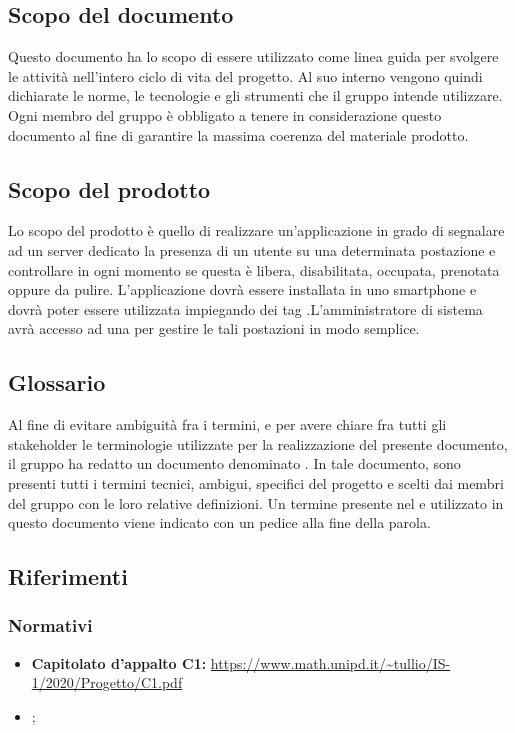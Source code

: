 \subsection{Scopo del documento}
Questo documento ha lo scopo di essere utilizzato come linea guida per svolgere le attività nell'intero ciclo di vita del progetto.
Al suo interno vengono quindi dichiarate le norme, le tecnologie e gli strumenti che il gruppo \Gruppo{} intende utilizzare.
Ogni membro del gruppo è obbligato a tenere in considerazione questo documento al fine di garantire la massima coerenza del materiale prodotto.
	
\subsection{Scopo del prodotto}
Lo scopo del prodotto è quello di realizzare un’applicazione in grado di segnalare ad un server
dedicato la presenza di un utente su una determinata postazione e controllare in ogni momento
se questa è libera, disabilitata, occupata, prenotata oppure da pulire. L’applicazione dovrà essere
installata in uno smartphone  e dovrà poter essere utilizzata impiegando
dei tag .L'amministratore di sistema avrà accesso ad una  per gestire le tali postazioni in modo semplice.

\subsection{Glossario}
Al fine di evitare ambiguità fra i termini, e per avere chiare fra tutti gli stakeholder le terminologie utilizzate per la realizzazione del presente documento, il gruppo \Gruppo{} ha redatto un documento denominato \Gv{}.
In tale documento, sono presenti tutti i termini tecnici, ambigui, specifici del progetto e scelti dai membri del gruppo con le loro relative definizioni.
Un termine presente nel \Gv{} e utilizzato in questo documento viene indicato con un pedice \glo{} alla fine della parola.

\subsection{Riferimenti} 
\subsubsection{Normativi}
\begin{itemize}
	\item \textbf{Capitolato d'appalto C1:} \url{https://www.math.unipd.it/~tullio/IS-1/2020/Progetto/C1.pdf}
	\item \NdPv{};
\end{itemize}

